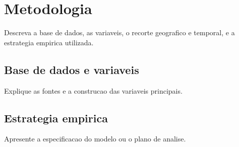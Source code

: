 \section{Metodologia}

Descreva a base de dados, as variaveis, o recorte geografico e temporal, e a estrategia empirica utilizada.

\subsection{Base de dados e variaveis}

Explique as fontes e a construcao das variaveis principais.

\subsection{Estrategia empirica}

Apresente a especificacao do modelo ou o plano de analise.